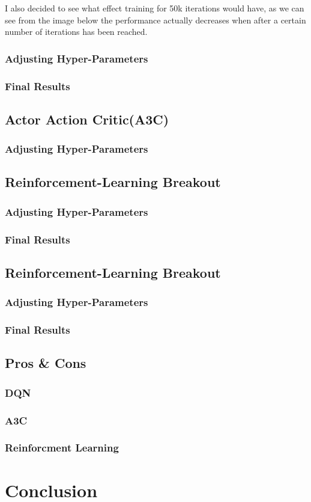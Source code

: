 \documentclass[conference]{IEEEtran}
\begin{document}
I also decided to see what effect training for 50k iterations would have, as we can see from the image below the performance actually decreases when after a certain number of iterations has been reached.  
\subsubsection{Adjusting Hyper-Parameters}
\subsubsection{Final Results}

\subsection{Actor Action Critic(A3C)}

\subsubsection{Adjusting Hyper-Parameters}

\subsection{Reinforcement-Learning Breakout}
\subsubsection{Adjusting Hyper-Parameters}
\subsubsection{Final Results}

\subsection{Reinforcement-Learning Breakout}
\subsubsection{Adjusting Hyper-Parameters}
\subsubsection{Final Results}

\subsection{Pros \& Cons}
\subsubsection{DQN}
\subsubsection{A3C}
\subsubsection{Reinforcment Learning}
\section{Conclusion}

\newpage
\printbibliography
\end{document}

